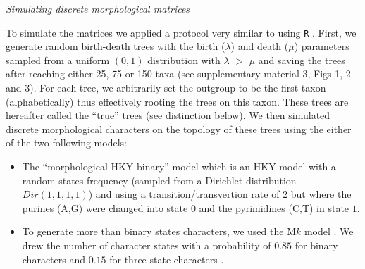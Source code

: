 \documentclass[12pt,letterpaper]{article}
\renewcommand{\subsection}[1]{%
\bigskip
\begin{center}
\begin{large}
\normalfont\itshape #1
\end{large}
\end{center}}
\begin{document}
\subsection{Simulating discrete morphological matrices}
To simulate the matrices we applied a protocol very similar to \cite{Guillerme2016146} using \texttt{R} \citep{R}.
First, we generate random birth-death trees with the birth ($\lambda$) and death ($\mu$) parameters sampled from a uniform $(0,1)$ distribution with $\lambda$ $>$ $\mu$\citep[\texttt{diversitree} v0.9-8;][]{fitzjohndiversitree2012} and saving the trees after reaching either 25, 75 or 150 taxa (see supplementary material 3, Figs 1, 2 and 3).
For each tree, we arbitrarily set the outgroup to be the first taxon (alphabetically) thus effectively rooting the trees on this taxon.
These trees are hereafter called the ``true'' trees (see distinction below).
We then simulated discrete morphological characters on the topology of these trees using the either of the two following models:
\begin{itemize}
    \item The ``morphological HKY-binary'' model \citep{OReilly20160081} which is an HKY model \citep{HKY85} with a random states frequency (sampled from a Dirichlet distribution $Dir(1,1,1,1)$) and using a transition/transvertion rate of $2$ \citep{douadycomparison2003} but where the purines (A,G) were changed into state $0$ and the pyrimidines (C,T) in state $1$.
    \item To generate more than binary states characters, we used the M$k$ model \citep{lewisa2001}.
    We drew the number of character states with a probability of $0.85$ for binary characters and $0.15$ for three state characters \citep{Guillerme2016146,ZouConvergence}.
\end{itemize}
\end{document}
